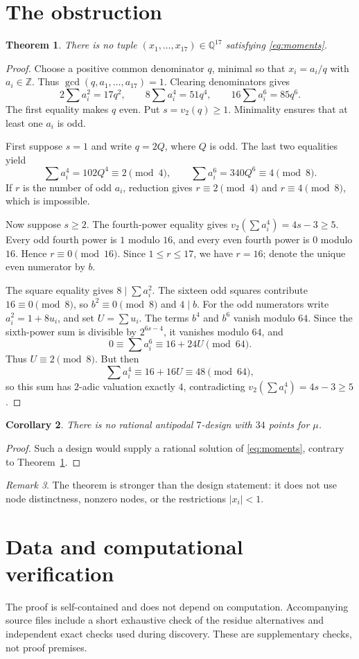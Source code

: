 \documentclass[11pt]{amsart}
\newtheorem{theorem}{Theorem}[section]
\newtheorem{corollary}[theorem]{Corollary}
\theoremstyle{remark}\newtheorem{remark}[theorem]{Remark}
\begin{document}
\section{The obstruction}
\begin{theorem}\label{thm:main}
There is no tuple $(x_1,\ldots,x_{17})\in\mathbb Q^{17}$ satisfying
\eqref{eq:moments}.
\end{theorem}
\begin{proof}
Choose a positive common denominator $q$, minimal so that $x_i=a_i/q$ with
$a_i\in\mathbb Z$. Thus $\gcd(q,a_1,\ldots,a_{17})=1$. Clearing
denominators gives
\begin{equation}\label{eq:cleared}
 2\sum a_i^2=17q^2,\qquad 8\sum a_i^4=51q^4,\qquad
 16\sum a_i^6=85q^6.
\end{equation}
The first equality makes $q$ even. Put $s=v_2(q)\geq1$. Minimality ensures
that at least one $a_i$ is odd.

First suppose $s=1$ and write $q=2Q$, where $Q$ is odd. The last two
equalities yield
\[
 \sum a_i^4=102Q^4\equiv2\pmod4,
 \qquad \sum a_i^6=340Q^6\equiv4\pmod8.
\]
If $r$ is the number of odd $a_i$, reduction gives
$r\equiv2\pmod4$ and $r\equiv4\pmod8$, which is impossible.

Now suppose $s\geq2$. The fourth-power equality gives
$v_2(\sum a_i^4)=4s-3\geq5$. Every odd fourth power is $1$ modulo $16$,
and every even fourth power is $0$ modulo $16$. Hence
$r\equiv0\pmod{16}$. Since $1\leq r\leq17$, we have $r=16$; denote the
unique even numerator by $b$.

The square equality gives $8\mid\sum a_i^2$. The sixteen odd squares
contribute $16\equiv0\pmod8$, so $b^2\equiv0\pmod8$ and $4\mid b$.
For the odd numerators write $a_i^2=1+8u_i$, and set $U=\sum u_i$.
The terms $b^4$ and $b^6$ vanish modulo $64$. Since the sixth-power sum is
divisible by $2^{6s-4}$, it vanishes modulo $64$, and
\[
 0\equiv\sum a_i^6\equiv16+24U\pmod{64}.
\]
Thus $U\equiv2\pmod8$. But then
\[
 \sum a_i^4\equiv16+16U\equiv48\pmod{64},
\]
so this sum has $2$-adic valuation exactly $4$, contradicting
$v_2(\sum a_i^4)=4s-3\geq5$.
\end{proof}
\begin{corollary}
There is no rational antipodal $7$-design with $34$ points for $\mu$.
\end{corollary}
\begin{proof}
Such a design would supply a rational solution of \eqref{eq:moments},
contrary to Theorem~\ref{thm:main}.
\end{proof}
\begin{remark}
The theorem is stronger than the design statement: it does not use node
distinctness, nonzero nodes, or the restrictions $|x_i|<1$.
\end{remark}
\section*{Data and computational verification}
The proof is self-contained and does not depend on computation. Accompanying
source files include a short exhaustive check of the residue alternatives and
independent exact checks used during discovery. These are supplementary
checks, not proof premises.


\end{document}
